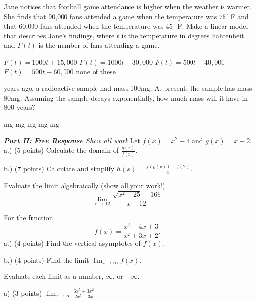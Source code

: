 \documentclass[11pt]{article}
\begin{document}
\begin{questions}
\begin{multiplechoice}{5}
\question Jane notices that football game attendance is higher when the weather is warmer.  She finds that 90,000 fans attended a game when the temperature was $75^\circ$ F and that 60,000 fans attended when the temperature was $45^\circ$ F.  Make a linear model that describes Jane's findings, where $t$ is the temperature in degrees Fahrenheit and $F(t)$ is the number of fans attending a game.
\begin{answers}{3}
\ans $F(t) = 1000t+15,000$
\ans $F(t) = 1000t-30,000$
\ans $F(t) = 500t+40,000$
\ans $F(t) = 500t - 60,000$
\ans none of these
\end{answers}

 years ago, a radioactive sample had mass 100mg.  At present, the sample has mass 80mg.  Assuming the sample decays exponentially, how much mass will it have in 800 years?
\begin{answers}{2}
 mg
 mg %
 mg
 mg
 mg
\end{answers}


\end{multiplechoice}
\vspace{.2in}

\nextpage
\noindent \emph{{\bf Part II: Free Response}{  Show all work}}
\question[12] Let $f(x)=x^2-4$ and $g(x) = x+2$.\\

a.) (5 points) Calculate the domain of $\frac{g(x)}{f(x)}$.
\vspace{1.25in}

b.) (7 points) Calculate and simplify $h(x) = \frac{f(g(x))-f(2)}{x}$.
\vspace{2.25in}




\question[10] Evaluate the limit algebraically (show all your work!)
\[\lim_{x\to 12} \frac{\sqrt{x^2+25} - 169}{x-12}.\]
\vspace{3.25in}

\question[8] For the function 
\[f(x) = \frac{x^2-4x+3}{x^2+3x+2},\]
a.) (4 points) Find the vertical asymptotes of $f(x)$.
\vspace{2.25in}

b.) (4 points) Find the limit $\lim_{x\to \infty} f(x)$.
\vspace{2.25in}

\question[15] Evaluate each limit as a number, $\infty$, or $-\infty$.

a) (3 points) $\displaystyle \lim_{x\to\infty} \frac{6x^5 + 3x^2}{2x^5 - 3x}$


\end{questions}
\end{document}
